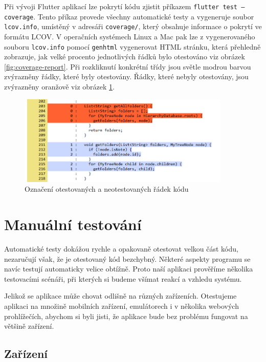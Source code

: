 \documentclass[czech, bc, kiv, he, iso690numb]{fasthesis}
\begin{document}
Při vývoji Flutter aplikací lze pokrytí kódu zjistit příkazem \texttt{flutter test --coverage}. Tento příkaz provede všechny automatické testy a vygeneruje soubor \texttt{lcov.info}, umístěný v adresáři \texttt{coverage/}, který obsahuje informace o pokrytí ve formátu \gls{LCOV}. V operačních systémech Linux a Mac pak lze z vygenerovaného souboru \texttt{lcov.info} pomocí \texttt{genhtml} vygenerovat \gls{HTML} stránku, která přehledně zobrazuje, jak velké procento jednotlivých řádků bylo otestováno viz obrázek \ref{fig:coverage-report}. Při rozkliknutí konkrétní třídy jsou světle modrou barvou zvýrazněny řádky, které byly otestovány. Řádky, které nebyly otestovány, jsou zvýrazněny oranžově viz obrázek \ref{fig:line-coverage}. 

\begin{figure}[h!]
  \centering
  \includegraphics[width=0.9\textwidth]{img/BP-Runt/Testing/line-coverage.PNG}
  \caption{Označení otestovaných a neotestovaných řádek kódu}
  \label{fig:line-coverage}
\end{figure}

\newpage

\section{Manuální testování}

Automatické testy dokážou rychle a opakovaně otestovat velkou část kódu, nezaručují však, že je otestovaný kód bezchybný. Některé aspekty programu se navíc testují automaticky velice obtížně. Proto naší aplikaci prověříme několika testovacími scénáři, při kterých si budeme všímat reakcí a vzhledu systému.

Jelikož se aplikace může chovat odlišně na různých zařízeních. Otestujeme aplikaci na množině mobilních zařízení, emulátorech i v několika webových prohlížečích, abychom si byli jisti, že aplikace bude bez problému fungovat na většině zařízení. 

\subsection{Zařízení}
\end{document}

